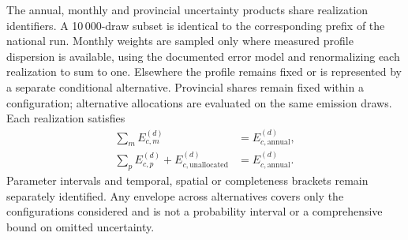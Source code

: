 \documentclass[essd]{copernicus}
\begin{document}
The annual, monthly and provincial uncertainty products share realization identifiers. A 10\,000-draw subset is identical to the corresponding prefix of the national run. Monthly weights are sampled only where measured profile dispersion is available, using the documented error model and renormalizing each realization to sum to one. Elsewhere the profile remains fixed or is represented by a separate conditional alternative. Provincial shares remain fixed within a configuration; alternative allocations are evaluated on the same emission draws. Each realization satisfies
\begin{equation}
 \begin{split}
 \sum_m E_{c,m}^{(d)}&=E_{c,\mathrm{annual}}^{(d)},\\
 \sum_p E_{c,p}^{(d)}+E_{c,\mathrm{unallocated}}^{(d)}
 &=E_{c,\mathrm{annual}}^{(d)}.
 \end{split}
 \label{eq:uncertainty_allocation}
\end{equation}
Parameter intervals and temporal, spatial or completeness brackets remain separately identified. Any envelope across alternatives covers only the configurations considered and is not a probability interval or a comprehensive bound on omitted uncertainty.
\end{document}
